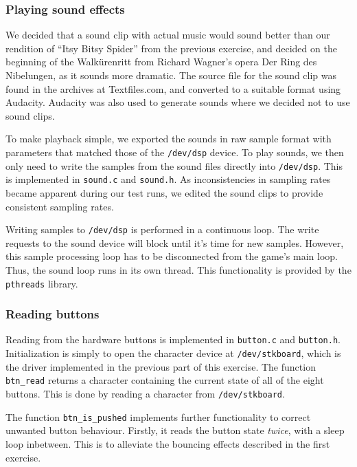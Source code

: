 \subsubsection{Playing sound effects}

We decided that a sound clip with actual music would sound better than
our rendition of ``Itsy Bitsy Spider'' from the previous exercise, and
decided on the beginning of the Walkürenritt from Richard Wagner's
opera Der Ring des Nibelungen, as it sounds more dramatic. The source
file for the sound clip was found in the archives at Textfiles.com, and
converted to a suitable format using Audacity. Audacity was also used to
generate sounds where we decided not to use sound clips.

To make playback simple, we exported the sounds in raw sample format
with parameters that matched those of the \texttt{/dev/dsp} device. To
play sounds, we then only need to write the samples from the sound files
directly into \texttt{/dev/dsp}. This is implemented in \texttt{sound.c}
and \texttt{sound.h}. As inconsistencies in sampling rates became
apparent during our test runs, we edited the sound clips to provide
consistent sampling rates.

Writing samples to \texttt{/dev/dsp} is performed in a continuous loop.
The write requests to the sound device will block until it's time for
new samples. However, this sample processing loop has to be disconnected
from the game's main loop. Thus, the sound loop runs in its own thread.
This functionality is provided by the \texttt{pthreads} library.

\subsubsection{Reading buttons}

Reading from the hardware buttons is implemented in \texttt{button.c}
and \texttt{button.h}. Initialization is simply to open the character
device at \texttt{/dev/stkboard}, which is the driver implemented in the
previous part of this exercise. The function \texttt{btn\_read} returns
a character containing the current state of all of the eight buttons.
This is done by reading a character from \texttt{/dev/stkboard}.

The function \texttt{btn\_is\_pushed} implements further functionality to
correct unwanted button behaviour. Firstly, it reads the button state
\emph{twice}, with a sleep loop inbetween. This is to alleviate the
bouncing effects described in the first exercise.

